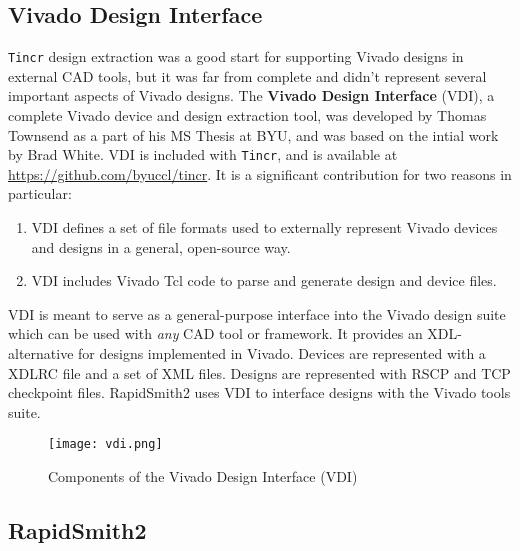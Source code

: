 \subsection{Vivado Design Interface}
\texttt{Tincr} design extraction was a good start for supporting Vivado designs
in external CAD tools, but it was far from complete and didn't represent several
important aspects of Vivado designs. The \textbf{Vivado Design Interface} (VDI),
a complete Vivado device and design extraction tool, was developed by Thomas
Townsend as a part of his MS Thesis at BYU, and was based on the intial work by
Brad White.
VDI is included with
\texttt{Tincr}, and is available at {\color{blue}
\url{https://github.com/byuccl/tincr}}. It is a  significant contribution for
two reasons in particular:

\begin{enumerate}
  \item VDI defines a set of file formats used to externally represent
  Vivado devices and designs in a general, open-source way.
  
  \item VDI includes Vivado Tcl code to parse and generate design and device
  files.
\end{enumerate}

\noindent VDI is meant to serve as a general-purpose interface into the Vivado
design suite which can be used with \textit{any} CAD tool or framework. It
provides an XDL-alternative for designs implemented in Vivado. Devices are
represented with a XDLRC file and a set of XML files. Designs are represented
with RSCP and TCP checkpoint files. RapidSmith2 uses VDI to interface designs
with the Vivado tools suite.

\begin{figure}[h!]
 \centering
 \texttt{[image: vdi.png]}
 \caption{Components of the Vivado Design Interface (VDI)}
 \label{fig:vdi}
\end{figure}

\subsection{RapidSmith2}


